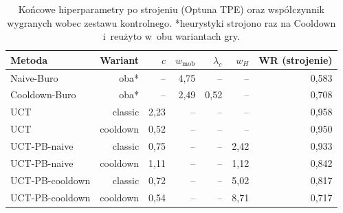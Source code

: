 \begin{table}[H]
\centering
\small
\begin{tabular}{lrrrrrr}
\toprule
Metoda & Wariant & $c$ & $w_{\mathrm{mob}}$ & $\lambda_c$ & $w_H$ & WR (strojenie) \\
\midrule
Naive-Buro & oba* & -- & 4,75 & -- & -- & 0,583 \\
Cooldown-Buro & oba* & -- & 2,49 & 0,52 & -- & 0,708 \\
UCT & classic & 2,23 & -- & -- & -- & 0,958 \\
UCT & cooldown & 0,52 & -- & -- & -- & 0,950 \\
UCT-PB-naive & classic & 0,75 & -- & -- & 2,42 & 0,933 \\
UCT-PB-naive & cooldown & 1,11 & -- & -- & 1,12 & 0,842 \\
UCT-PB-cooldown & classic & 0,72 & -- & -- & 5,02 & 0,817 \\
UCT-PB-cooldown & cooldown & 0,54 & -- & -- & 8,71 & 0,717 \\
\bottomrule
\end{tabular}
\caption{Końcowe hiperparametry po strojeniu (Optuna TPE) oraz współczynnik wygranych wobec zestawu kontrolnego. *heurystyki strojono raz na Cooldown i~reużyto w~obu wariantach gry.}
\label{tab:hyperparams}
\end{table}
